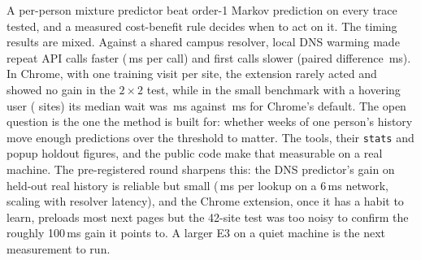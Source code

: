A per-person mixture predictor beat order-1 Markov prediction on every trace tested, and a measured cost-benefit rule decides when to act on it. The timing results are mixed. Against a shared campus resolver, local DNS warming made repeat API calls faster (\,ms per call) and first calls slower (paired difference \,ms). In Chrome, with one training visit per site, the extension rarely acted and showed no gain in the $2\times2$ test, while in the small benchmark with a hovering user ( sites) its median wait was \,ms against \,ms for Chrome's default. The open question is the one the method is built for: whether weeks of one person's history move enough predictions over the threshold to matter. The tools, their \texttt{stats} and popup holdout figures, and the public code make that measurable on a real machine. The pre-registered round sharpens this: the DNS predictor's gain on held-out real history is reliable but small (\,ms per lookup on a 6\,ms network, scaling with resolver latency), and the Chrome extension, once it has a habit to learn, preloads most next pages but the 42-site test was too noisy to confirm the roughly 100\,ms gain it points to. A larger E3 on a quiet machine is the next measurement to run.
